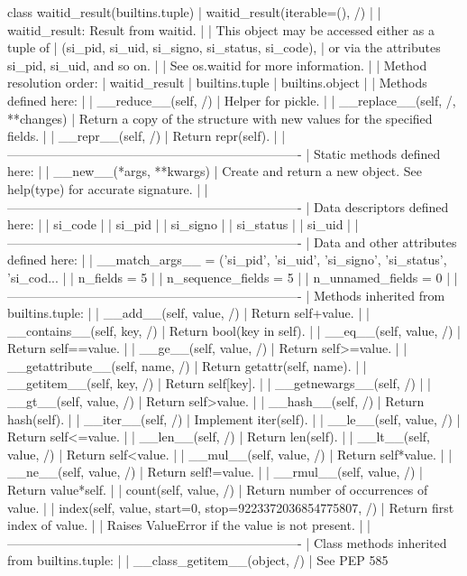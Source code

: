 \documentclass{article}
\begin{document}
    class waitid_result(builtins.tuple)
     |  waitid_result(iterable=(), /)
     |
     |  waitid_result: Result from waitid.
     |
     |  This object may be accessed either as a tuple of
     |    (si_pid, si_uid, si_signo, si_status, si_code),
     |  or via the attributes si_pid, si_uid, and so on.
     |
     |  See os.waitid for more information.
     |
     |  Method resolution order:
     |      waitid_result
     |      builtins.tuple
     |      builtins.object
     |
     |  Methods defined here:
     |
     |  __reduce__(self, /)
     |      Helper for pickle.
     |
     |  __replace__(self, /, **changes)
     |      Return a copy of the structure with new values for the specified fields.
     |
     |  __repr__(self, /)
     |      Return repr(self).
     |
     |  ----------------------------------------------------------------------
     |  Static methods defined here:
     |
     |  __new__(*args, **kwargs)
     |      Create and return a new object.  See help(type) for accurate signature.
     |
     |  ----------------------------------------------------------------------
     |  Data descriptors defined here:
     |
     |  si_code
     |
     |  si_pid
     |
     |  si_signo
     |
     |  si_status
     |
     |  si_uid
     |
     |  ----------------------------------------------------------------------
     |  Data and other attributes defined here:
     |
     |  __match_args__ = ('si_pid', 'si_uid', 'si_signo', 'si_status', 'si_cod...
     |
     |  n_fields = 5
     |
     |  n_sequence_fields = 5
     |
     |  n_unnamed_fields = 0
     |
     |  ----------------------------------------------------------------------
     |  Methods inherited from builtins.tuple:
     |
     |  __add__(self, value, /)
     |      Return self+value.
     |
     |  __contains__(self, key, /)
     |      Return bool(key in self).
     |
     |  __eq__(self, value, /)
     |      Return self==value.
     |
     |  __ge__(self, value, /)
     |      Return self>=value.
     |
     |  __getattribute__(self, name, /)
     |      Return getattr(self, name).
     |
     |  __getitem__(self, key, /)
     |      Return self[key].
     |
     |  __getnewargs__(self, /)
     |
     |  __gt__(self, value, /)
     |      Return self>value.
     |
     |  __hash__(self, /)
     |      Return hash(self).
     |
     |  __iter__(self, /)
     |      Implement iter(self).
     |
     |  __le__(self, value, /)
     |      Return self<=value.
     |
     |  __len__(self, /)
     |      Return len(self).
     |
     |  __lt__(self, value, /)
     |      Return self<value.
     |
     |  __mul__(self, value, /)
     |      Return self*value.
     |
     |  __ne__(self, value, /)
     |      Return self!=value.
     |
     |  __rmul__(self, value, /)
     |      Return value*self.
     |
     |  count(self, value, /)
     |      Return number of occurrences of value.
     |
     |  index(self, value, start=0, stop=9223372036854775807, /)
     |      Return first index of value.
     |
     |      Raises ValueError if the value is not present.
     |
     |  ----------------------------------------------------------------------
     |  Class methods inherited from builtins.tuple:
     |
     |  __class_getitem__(object, /)
     |      See PEP 585
\end{document}
